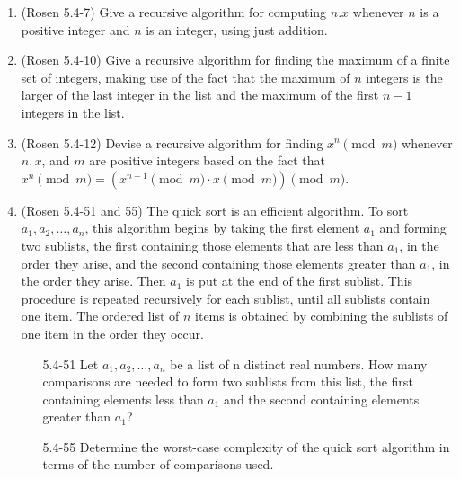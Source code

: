 \begin{enumerate}
\item \streasy (Rosen 5.4-7)  Give a recursive algorithm for computing $n.x$ whenever $n$ is a positive integer and $n$ is an integer, using just addition.

\item \streasy (Rosen 5.4-10) Give a recursive algorithm for finding the maximum of a finite set of integers, making use of the fact that the maximum of $n$ integers is the larger of the last integer in the list and the maximum of the first $n - 1$ integers in the list.

\item \streasy (Rosen 5.4-12)  Devise a recursive algorithm for finding $x^n \pmod{m}$ whenever $n, x$, and $m$ are positive integers based on the fact that $x^n \pmod{m}= (x^{n-1} \pmod{m}\cdot x\pmod{m})\pmod{m}$.

\item (Rosen 5.4-51 and 55) The quick sort is an efficient algorithm. To sort $a_1,a_2,\ldots,a_n$, this algorithm begins by taking the first element $a_1$ and forming two sublists, the first containing those elements that are less than $a_1$, in the order they arise, and the second containing those elements greater than $a_1$, in the order they arise. Then $a_1$ is put at the end of the first sublist. This procedure is repeated recursively for each sublist, until all sublists contain one item. The ordered list of $n$ items is obtained by combining the sublists of one item in the order they occur.
\begin{itemize}
\item[5.4-51] \strmedium  Let $a_1,a_2,\ldots,a_n$ be a list of n distinct real numbers. How many comparisons are needed to form two sublists from this list, the first containing elements less than $a_1$ and the second containing elements greater than $a_1$?
\item[5.4-55] \strhard Determine the worst-case complexity of the quick sort algorithm in terms of the number of comparisons used.

\end{itemize}

\end{enumerate}



